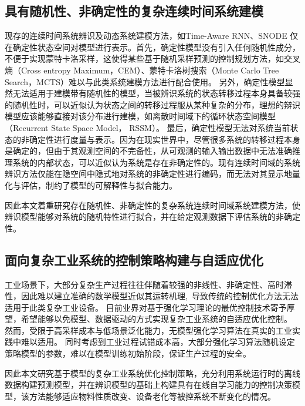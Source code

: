 \subsection{具有随机性、非确定性的复杂连续时间系统建模}
现存的连续时间系统辨识及动态系统建模方法，如Time-Aware RNN\cite{Demeester2019}、SNODE\cite{Quaglino2019} 仅在确定性状态空间对模型进行表示。首先，确定性模型没有引入任何随机性成分，不便于实现蒙特卡洛采样，这使得某些基于随机采样预测的控制规划方法，如交叉熵（Cross entropy Maximum，CEM）、蒙特卡洛树搜索（Monte Carlo Tree Search，MCTS）难以与此类系统建模方法进行配合使用。
另外，确定性模型显然无法适用于建模带有随机性的模型，当被辨识系统的状态转移过程本身具备较强的随机性时，可以近似认为状态之间的转移过程服从某种复杂的分布，理想的辩识模型应该能够直接对该分布进行建模，如离散时间域下的循环状态空间模型（Recurrent State Space Model， RSSM）。
最后，确定性模型无法对系统当前状态的非确定性进行度量与表示。因为在现实世界中，尽管很多系统的转移过程本身是确定的，但由于其观测空间的不完备性，从可观测的输入输出数据中无法准确推理系统的内部状态，可以近似认为系统是存在非确定性的。现有连续时间域的系统辨识方法仅能在隐空间中隐式地对系统的非确定性进行编码，而无法对其显示地量化与评估，制约了模型的可解释性与拟合能力。

因此本文着重研究存在随机性、非确定性的复杂系统连续时间域系统建模方法，使辨识模型能够对系统的随机特性进行拟合，并在给定观测数据下评估系统的非确定性。

\subsection{面向复杂工业系统的控制策略构建与自适应优化}
工业场景下，大部分复杂生产过程往往伴随着较强的非线性、非确定性、高时滞性，因此难以建立准确的数学模型近似其运转机理, 导致传统的控制优化方法无法适用于此类复杂工业设备。
目前业界对基于强化学习理论的最优控制技术\cite{Sutton2018}\cite{F.L.LewisD.Vrabie2012}寄予厚望，希望能够以免模型、数据驱动的方式实现复杂工业系统的自适应优化控制。
然而，受限于高采样成本与低场景泛化能力，无模型强化学习算法在真实的工业实践中难以适用。
同时考虑到工业过程试错成本高，大部分强化学习算法随机设定策略模型的参数，难以在模型训练初始阶段，保证生产过程的安全。

因此本文研究基于模型的复杂工业系统优化控制策略，充分利用系统运行时的离线数据构建预测模型，并在辨识模型的基础上构建具有在线自学习能力的控制决策模型，该方法能够适应物料性质改变、设备老化等被控系统不断变化的情况。

